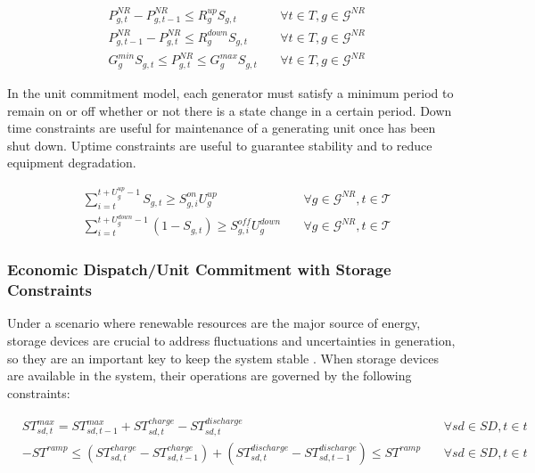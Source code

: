 \documentclass[12pt,LUDisStyle,twosided]{book}
\newcommand{\mc}{\mathcal}
\begin{document}
\begin{subequations}\label{model:UC_NewConstraints}
\begin{alignat}{4}
& P^{NR}_{g,t} - P^{NR}_{g,t - 1} \leq R^{up}_{g} S_{g,t} &~& \forall t \in T, g \in \mc{G}^{NR}\label{eq:UCrampUpRateConstraint} \\
& P^{NR}_{g,t -1 } - P^{NR}_{g,t} \leq R^{down}_{g} S_{g,t} &~& \forall t \in T, g \in \mc{G}^{NR}\label{eq:UCrampDownRateConstraint} \\
& G^{min}_{g} S_{g,t}\leq P^{NR}_{g,t} \leq G^{max}_{g} S_{g,t} &~& \forall t \in T, g \in \mc{G}^{NR}\label{eq:UCgenerationBounds}
\end{alignat} 
\end{subequations}
 


In the unit commitment model, each generator must satisfy a minimum period to remain on or off whether  or not there is a state change in a certain period. Down time constraints are useful for maintenance of a generating unit once has been shut down. Uptime constraints are useful to guarantee stability and to reduce equipment degradation. 

\begin{subequations}\label{model:ucMinDownUpConstraints}
\begin{alignat}{4}
& \sum_{i = t}^{t + U^{up}_{g} - 1} S_{g,t} \geq S^{on}_{g,i} U^{up}_{g} &~& \forall g \in \mc{G}^{NR}, t \in \mc{T} \label{eq:mindownt} \\
& \sum_{i = t}^{t + U^{down}_{g} - 1} (1 -S_{g,t}) \geq S^{off}_{g,i} U^{down}_{g} &~& \forall g \in \mc{G}^{NR}, t \in \mc{T} \label{eq:minupt}
\end{alignat} 
\end{subequations}

\subsubsection{Economic Dispatch/Unit Commitment with Storage Constraints}

Under a scenario where renewable resources are the major source of energy, storage devices are crucial to address fluctuations and uncertainties in generation, so they are an important key to keep the system stable \cite{dwyer}. When storage devices are available in the system, their operations are governed by the following constraints:

\begin{subequations}\label{model:storageConstraints}
\begin{alignat}{4}
& ST^{max}_{sd,t} = ST^{max}_{sd,t - 1} + ST^{charge}_{sd,t} - ST^{discharge}_{sd,t}  &~& \forall sd \in SD, t \in t \label{eq:storageLimits} \\
&  -ST^{ramp} \leq (ST^{charge}_{sd,t} - ST^{charge}_{sd,t-1}) + (ST^{discharge}_{sd,t} - ST^{discharge}_{sd,t-1}) \leq ST^{ramp}  &~& \forall sd \in SD, t \in t \label{eq:storageRamping}
\end{alignat} 
\end{subequations}
\end{document}
